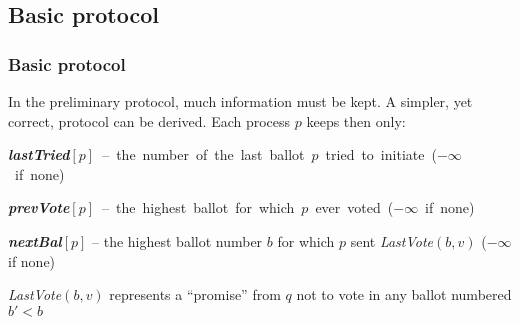 \documentclass[10 pt]{beamer}
\begin{document}
\subsection{Basic protocol}


\begin{frame}
\frametitle{Basic protocol}

In the preliminary protocol, much information must be kept. A simpler, yet correct, protocol can be derived. Each process $p$ keeps then only:

\vspace{2 mm}
\mbox{\textit{\textbf{lastTried}}$[p]$ -- the number of the last ballot $p$ tried to initiate ($-\infty$ if none)}

\vspace{2mm}
\mbox{\textit{\textbf{prevVote}}$[p]$ -- the highest ballot for which $p$ ever voted ($-\infty$ if none)}

\vspace{2mm}
\textit{\textbf{nextBal}}$[p]$ -- the highest ballot number $b$ for which $p$ sent \textit{LastVote}$(b, v)$ ($-\infty$ if none)


\vspace{4mm}
\textit{LastVote}$(b, v)$ represents a ``promise'' from $q$ not to vote in any ballot numbered $b' < b$

\end{frame}
\end{document}
